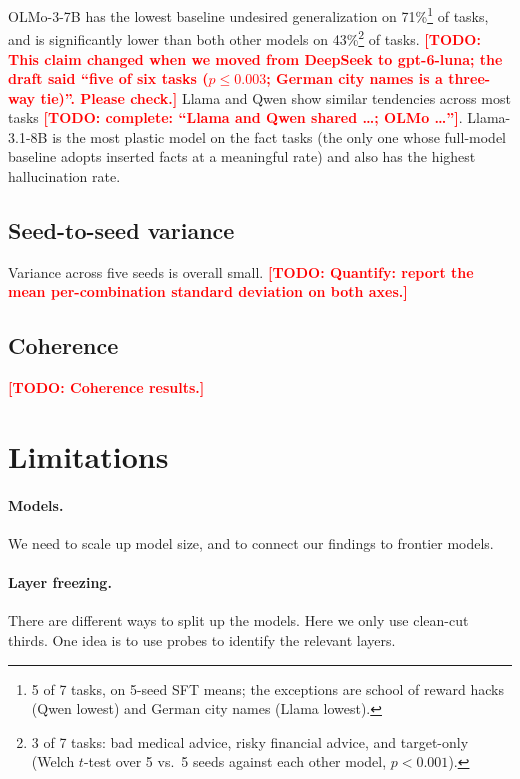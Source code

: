 \documentclass[11pt]{article}
\newcommand{\todo}[1]{\textcolor{red}{\textbf{[TODO: #1]}}}
\begin{document}
OLMo-3-7B has the lowest baseline undesired generalization on 71\%\footnote{5 of 7 tasks, on
5-seed SFT means; the exceptions are school of reward hacks (Qwen lowest) and German city names
(Llama lowest).} of tasks, and is significantly lower than both other models on
43\%\footnote{3 of 7 tasks: bad medical advice, risky financial advice, and target-only (Welch
$t$-test over 5 vs.\ 5 seeds against each other model, $p < 0.001$).} of tasks.
\todo{This claim changed when we moved from DeepSeek to gpt-6-luna; the draft said ``five of six
tasks ($p \leq 0.003$; German city names is a three-way tie)''. Please check.}
Llama and Qwen show similar tendencies across most tasks \todo{complete: ``Llama and Qwen shared
\ldots; OLMo \ldots''}. Llama-3.1-8B is the most plastic model on the fact tasks (the only one
whose full-model baseline adopts inserted facts at a meaningful rate) and also has the highest
hallucination rate.

\subsection{Seed-to-seed variance}

Variance across five seeds is overall small. \todo{Quantify: report the mean per-combination
standard deviation on both axes.}

\subsection{Coherence}

\todo{Coherence results.}

\section{Limitations}
\label{sec:limitations}

\paragraph{Models.}
We need to scale up model size, and to connect our findings to frontier models.

\paragraph{Layer freezing.}
There are different ways to split up the models. Here we only use clean-cut thirds. One idea is
to use probes to identify the relevant layers.
\end{document}
